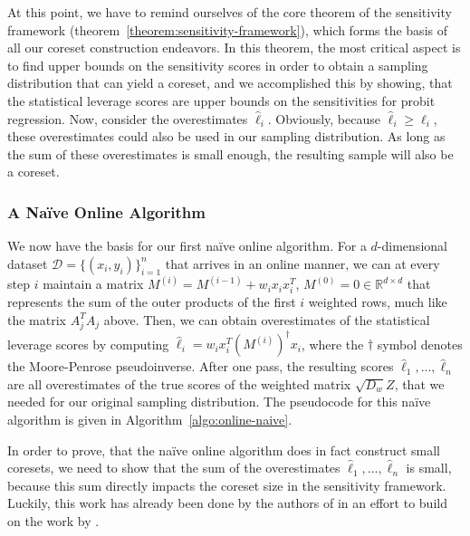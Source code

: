 At this point, we have to remind ourselves of the core theorem
of the sensitivity framework
(theorem~\ref{theorem:sensitivity-framework}), which forms the basis
of all our coreset construction endeavors.
In this theorem, the most critical aspect is to find upper bounds
on the sensitivity scores in order to obtain a sampling
distribution that can yield a coreset, and we accomplished
this by showing, that the statistical leverage scores are
upper bounds on the sensitivities for probit regression.
Now, consider the overestimates $\hat{\ell}_i$.
Obviously, because $\hat{\ell}_i \geq \ell_i$, these overestimates
could also be used in our sampling distribution.
As long as the sum of these overestimates is small enough, the
resulting sample will also be a coreset.

\subsubsection{A Na\"ive Online Algorithm}

We now have the basis for our first na\"ive online algorithm.
For a $d$-dimensional dataset
$\mathcal{D} = \{ (x_i, y_i) \}_{i=1}^n$ that arrives in an
online manner, we can at every step $i$ maintain a matrix
$M^{(i)} = M^{(i-1)} + w_i x_i x_i^T$,
$M^{(0)} = 0 \in \mathbb{R}^{d \times d}$ that represents the sum
of the outer products of the first $i$ weighted rows, much like the matrix
$A_j^TA_j$ above. Then, we can obtain overestimates of the statistical
leverage scores by computing $\hat{\ell}_i = w_i x_i^T (M^{(i)})^\dagger x_i$,
where the $\dagger$ symbol denotes the Moore-Penrose pseudoinverse.
After one pass, the resulting scores
$\hat{\ell}_1, ..., \hat{\ell}_n$ are all overestimates of the
true scores of the weighted matrix $\sqrt{D_w}Z$, that we
needed for our original sampling distribution.
The pseudocode for this na\"ive algorithm is given in
Algorithm~\ref{algo:online-naive}.

In order to prove, that the na\"ive online algorithm does in fact
construct small coresets, we need to show that the sum of the
overestimates $\hat{\ell}_1, ..., \hat{\ell}_n$ is small,
because this sum directly impacts the coreset size in the
sensitivity framework.
Luckily, this work has already been done by the authors of
\cite{tensor-factorization} in an effort to build on the work
by \cite{online-row-sampling}.

